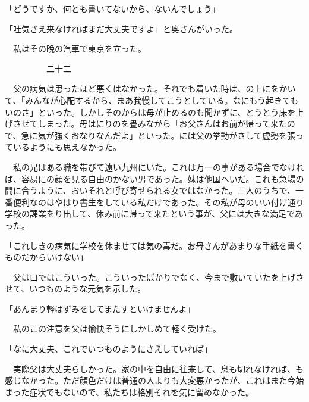 \documentclass[a4j,onecolumn]{tarticle}
\begin{document}
「どうですか、\hbox{}何とも書いてないから、\hbox{}ないんでしょう」\par{}
「吐気さえ来なければまだ大丈夫ですよ」と奥さんがいった。\hbox{}\par{}
　私はその晩の汽車で東京を立った。\hbox{}\par{}\par{}　　　　　二十二
\par{}
　父の病気は思ったほど悪くはなかった。\hbox{}それでも着いた時は、\hbox{}の上にをかいて、\hbox{}「みんなが心配するから、\hbox{}まあ我慢してこうとしている。\hbox{}なにもう起きてもいのさ」といった。\hbox{}しかしそのからは母が止めるのも聞かずに、\hbox{}とうとう床を上げさせてしまった。\hbox{}母はにりのを畳みながら「お父さんはお前が帰って来たので、\hbox{}急に気が強くおなりなんだよ」といった。\hbox{}には父の挙動がさして虚勢を張っているようにも思えなかった。\hbox{}\par{}
　私の兄はある職を帯びて遠い九州にいた。\hbox{}これは万一の事がある場合でなければ、\hbox{}容易にの顔を見る自由のかない男であった。\hbox{}妹は他国へいだ。\hbox{}これも急場の間に合うように、\hbox{}おいそれと呼び寄せられる女ではなかった。\hbox{}三人のうちで、\hbox{}一番便利なのはやはり書生をしている私だけであった。\hbox{}その私が母のいい付け通り学校の課業をり出して、\hbox{}休み前に帰って来たという事が、\hbox{}父には大きな満足であった。\hbox{}\par{}
「これしきの病気に学校を休ませては気の毒だ。\hbox{}お母さんがあまりな手紙を書くものだからいけない」\par{}
　父は口ではこういった。\hbox{}こういったばかりでなく、\hbox{}今まで敷いていたを上げさせて、\hbox{}いつものような元気を示した。\hbox{}\par{}
「あんまり軽はずみをしてまたすといけませんよ」\par{}
　私のこの注意を父は愉快そうにしかしめて軽く受けた。\hbox{}\par{}
「なに大丈夫、\hbox{}これでいつものようにさえしていれば」\par{}
　実際父は大丈夫らしかった。\hbox{}家の中を自由に往来して、\hbox{}息も切れなければ、\hbox{}も感じなかった。\hbox{}ただ顔色だけは普通の人よりも大変悪かったが、\hbox{}これはまた今始まった症状でもないので、\hbox{}私たちは格別それを気に留めなかった。\hbox{}\par{}
\end{document}
